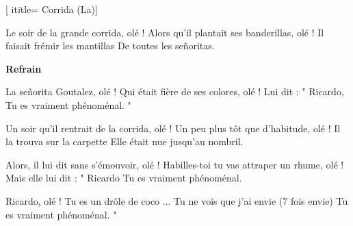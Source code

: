  [
ititle= {Corrida (La)}]

\beginverse
Le soir de la grande corrida, olé !
Alors qu'il plantait ses banderillas, olé !
Il faisait frémir les mantillas
De toutes les señoritas.
\endverse

\beginchorus
\textbf {Refrain}
\endchorus

\beginverse
La señorita Goutalez, olé !
Qui était fière de ses colores, olé !
Lui dit : " Ricardo,
Tu es vraiment phénoménal. "
\endverse

\beginverse
Un soir qu'il rentrait de la corrida, olé !
Un peu plus tôt que d'habitude, olé !
Il la trouva sur la carpette
Elle était nue jusqu'au nombril.
\endverse

\beginverse
Alors, il lui dit sans s'émouvoir, olé !
Habilles-toi tu vas attraper un rhume, olé !
Mais elle lui dit : " Ricardo
Tu es vraiment phénoménal.
\endverse

\beginverse
Ricardo, olé !
Tu es un drôle de coco ...
Tu ne vois que j'ai envie (7 fois envie)
Tu es vraiment phénoménal. "
\endverse
\endsong